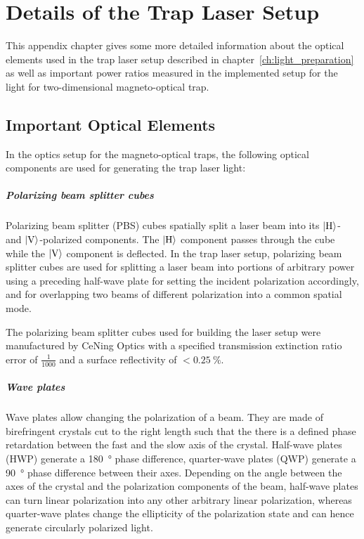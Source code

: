 \renewcommand{\imagepath}{../90-appendix/img}

\appendix

\chapter{Details of the Trap Laser Setup}
This appendix chapter gives some more detailed information about the optical elements used in the trap laser setup described in chapter~\ref{ch:light_preparation} as well as important power ratios measured in the implemented setup for the light for two-dimensional magneto-optical trap.

\section{Important Optical Elements}\label{ch:optical_components}
In the optics setup for the magneto-optical traps, the following optical components are used for generating the trap laser light:

\paragraph{Polarizing beam splitter cubes} Polarizing beam splitter (PBS) cubes spatially split a laser beam into its $\Ket{\text{H}}$- and $\Ket{\text{V}}$-polarized components. The $\Ket{\text{H}}$ component passes through the cube while the $\Ket{\text{V}}$ component is deflected. In the trap laser setup, polarizing beam splitter cubes are used for splitting a laser beam into portions of arbitrary power using a preceding half-wave plate for setting the incident polarization accordingly, and for overlapping two beams of different polarization into a common spatial mode.

The polarizing beam splitter cubes used for building the laser setup were manufactured by CeNing Optics with a specified transmission extinction ratio error of $\frac{1}{1000}$ and a surface reflectivity of $<\SI{0.25}{\percent}$.
    
\paragraph*{Wave plates} Wave plates allow changing the polarization of a beam. They are made of birefringent crystals cut to the right length such that the there is a defined phase retardation between the fast and the slow axis of the crystal. Half-wave plates (HWP) generate a \SI{180}{\degree} phase difference, quarter-wave plates (QWP) generate a \SI{90}{\degree} phase difference between their axes. Depending on the angle between the axes of the crystal and the polarization components of the beam, half-wave plates can turn linear polarization into any other arbitrary linear polarization, whereas quarter-wave plates change the ellipticity of the polarization state and can hence generate circularly polarized light.

